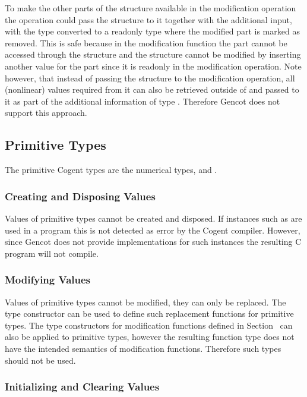 To make the other parts of the structure available in the modification operation the  operation could
pass the structure to it together with the additional input, with the type converted to a readonly type where the modified
part is marked as removed. This is safe because in the modification function the part cannot be accessed
through the structure and the structure cannot be modified by inserting another value for the part since it is
readonly in the modification operation. Note however, that instead of passing the structure to the modification operation,
all (nonlinear) values required from it can also be retrieved outside of  and passed to it as part of the 
additional information of type . Therefore Gencot does not support this approach.

\subsection{Primitive Types}
\label{design-operations-prim}

The primitive Cogent types are the numerical types,  and . 

\subsubsection{Creating and Disposing Values}

Values of primitive types cannot be created and disposed. If instances such as  are used in a program 
this is not detected as error by the Cogent compiler. However, since Gencot does not provide implementations for such
instances the resulting C program will not compile.

\subsubsection{Modifying Values}

Values of primitive types cannot be modified, they can only be replaced. The type constructor  
can be used to define such replacement functions for primitive types. The type constructors for modification functions
defined in Section~ can also
be applied to primitive types, however the resulting function type does not have the
intended semantics of modification functions. Therefore such types should not be used.

\subsubsection{Initializing and Clearing Values}

